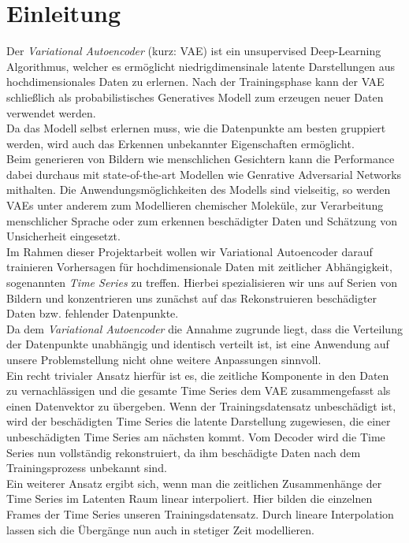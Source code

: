 \documentclass[12pt]{article}
\begin{document}
	\tableofcontents
	\newpage
	\section[Einleitung]{Einleitung}
	Der \emph{Variational Autoencoder} (kurz: VAE) ist ein unsupervised Deep-Learning Algorithmus, welcher es ermöglicht niedrigdimensinale latente Darstellungen aus hochdimensionales Daten zu erlernen. Nach der Trainingsphase kann der VAE schließlich als probabilistisches Generatives Modell zum erzeugen neuer Daten verwendet werden.\\
	Da das Modell selbst erlernen muss, 
	wie die Datenpunkte am besten gruppiert werden, wird auch das Erkennen unbekannter Eigenschaften ermöglicht.\\
	Beim generieren von Bildern wie menschlichen Gesichtern kann die Performance dabei durchaus mit state-of-the-art Modellen wie Genrative Adversarial Networks mithalten. Die Anwendungsmöglichkeiten des Modells sind vielseitig, so werden VAEs unter anderem zum Modellieren chemischer Moleküle, zur Verarbeitung menschlicher Sprache oder zum erkennen beschädigter Daten und Schätzung von Unsicherheit eingesetzt.\\
	Im Rahmen dieser Projektarbeit wollen wir Variational Autoencoder darauf trainieren Vorhersagen für hochdimensionale Daten mit zeitlicher Abhängigkeit, sogenannten \emph{Time Series} zu treffen. Hierbei 
	spezialisieren wir uns auf Serien von Bildern und 
	konzentrieren uns zunächst auf das Rekonstruieren beschädigter Daten bzw. fehlender Datenpunkte. \\
	Da dem \emph{Variational Autoencoder} die Annahme zugrunde liegt, dass die Verteilung der Datenpunkte 
	unabhängig und identisch verteilt ist, ist eine Anwendung auf unsere Problemstellung nicht ohne weitere 
	Anpassungen sinnvoll.\\
	Ein recht trivialer Ansatz hierfür ist es, die zeitliche Komponente in den Daten zu 
	vernachlässigen und die gesamte Time Series dem VAE zusammengefasst als einen Datenvektor zu übergeben. Wenn der Trainingsdatensatz unbeschädigt ist, wird der beschädigten Time Series die latente Darstellung zugewiesen, die einer unbeschädigten Time Series am nächsten kommt. Vom Decoder wird die Time Series nun vollständig rekonstruiert, da ihm beschädigte Daten nach dem Trainingsprozess unbekannt sind.\\
	Ein weiterer Ansatz ergibt sich, wenn man die zeitlichen Zusammenhänge der Time Series 
	im Latenten Raum linear interpoliert. Hier bilden die einzelnen Frames der Time Series unseren Trainingsdatensatz. Durch lineare Interpolation lassen sich die Übergänge nun auch in stetiger Zeit modellieren. \\
\end{document}
